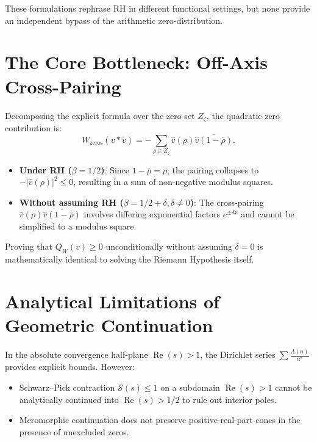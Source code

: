\documentclass[12pt, a4paper]{article}
\begin{document}
These formulations rephrase RH in different functional settings, but none provide an independent bypass of the arithmetic zero-distribution.

\section{The Core Bottleneck: Off-Axis Cross-Pairing}
Decomposing the explicit formula over the zero set $Z_\zeta$, the quadratic zero contribution is:
\begin{equation}
W_{\text{zeros}}(v * \widetilde{v}) = -\sum_{\rho \in Z_\zeta} \widehat{v}(\rho) \overline{\widehat{v}(1 - \overline{\rho})}.
\end{equation}

\begin{itemize}
    \item \textbf{Under RH ($\beta = 1/2$)}: Since $1 - \overline{\rho} = \rho$, the pairing collapses to $-|\widehat{v}(\rho)|^2 \le 0$, resulting in a sum of non-negative modulus squares.
    \item \textbf{Without assuming RH ($\beta = 1/2 + \delta, \delta \ne 0$)}: The cross-pairing $\widehat{v}(\rho) \overline{\widehat{v}(1 - \overline{\rho})}$ involves differing exponential factors $e^{\pm \delta x}$ and cannot be simplified to a modulus square.
\end{itemize}

Proving that $Q_W(v) \ge 0$ unconditionally without assuming $\delta = 0$ is mathematically identical to solving the Riemann Hypothesis itself.

\section{Analytical Limitations of Geometric Continuation}
In the absolute convergence half-plane $\operatorname{Re}(s) > 1$, the Dirichlet series $\sum \frac{\Lambda(n)}{n^s}$ provides explicit bounds. However:
\begin{itemize}
    \item Schwarz--Pick contraction $\mathcal{S}(s) \le 1$ on a subdomain $\operatorname{Re}(s) > 1$ cannot be analytically continued into $\operatorname{Re}(s) > 1/2$ to rule out interior poles.
    \item Meromorphic continuation does not preserve positive-real-part cones in the presence of unexcluded zeros.
\end{itemize}
\end{document}
